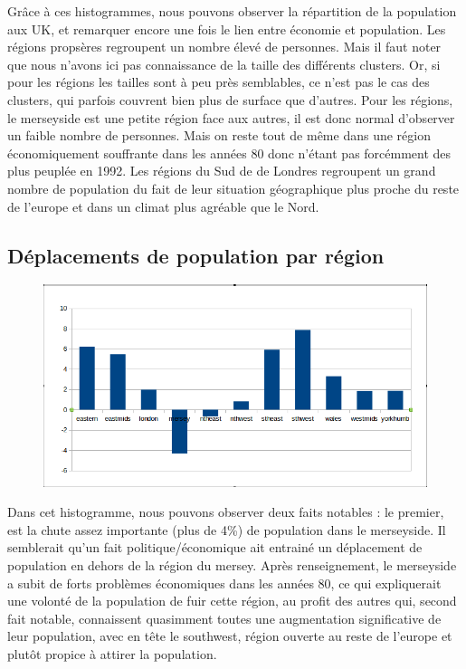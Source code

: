 Grâce à ces histogrammes, nous pouvons observer la répartition de la population aux UK, et remarquer encore une fois le lien entre économie et population. Les régions propsères regroupent un nombre élevé de personnes. Mais il faut noter que nous n'avons ici pas connaissance de la taille des différents clusters. Or, si pour les régions les tailles sont à peu près semblables, ce n'est pas le cas des clusters, qui parfois couvrent bien plus de surface que d'autres. Pour les régions, le merseyside est une petite région face aux autres, il est donc normal d'observer un faible nombre de personnes. Mais on reste tout de même dans une région économiquement souffrante dans les années 80 donc n'étant pas forcémment des plus peuplée en 1992.
Les régions du Sud de de Londres regroupent un grand nombre de population du fait de leur situation géographique plus proche du reste de l'europe et dans un climat plus agréable que le Nord.

\pagebreak


\subsection{Déplacements de population par région}
\begin{figure}[h!]
    \centering
    \includegraphics[width=\linewidth]{images/pop/deltaPopRegions.png}
\end{figure}

Dans cet histogramme, nous pouvons observer deux faits notables : le premier, est la chute assez importante (plus de 4\%) de population dans le merseyside. Il semblerait qu'un fait politique/économique ait entrainé un déplacement de population en dehors de la région du mersey. Après renseignement, le merseyside a subit de forts problèmes économiques dans les années 80, ce qui expliquerait une volonté de la population de fuir cette région, au profit des autres qui, second fait notable, connaissent quasimment toutes une augmentation significative de leur population, avec en tête le southwest, région ouverte au reste de l'europe et plutôt propice à attirer la population.



